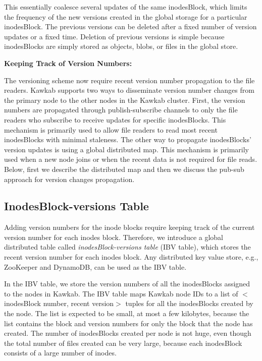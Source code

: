 \documentclass[]{article}
\newcommand{\subtopic}[1]{\vspace{1.5pt} \noindent \textbf{#1}}
\begin{document}
This essentially coalesce several updates of the same inodesBlock, which limits
the frequency of the new versions created in the global storage for a particular
inodesBlock. The previous versions can be deleted after a fixed number of
version updates or a fixed time. Deletion of previous versions is simple
because inodesBlocks are simply stored as objects, blobs, or files in the
global store.


\subtopic{Keeping Track of Version Numbers:}

The versioning scheme now require recent version number propagation to the file
readers. Kawkab supports two ways to disseminate version number changes from
the primary node to the other nodes in the Kawkab cluster. First, the version
numbers are propagated through publish-subscribe channels to only the file
readers who subscribe to receive updates for specific inodesBlocks.  This
mechanism is primarily used to allow file readers to read most recent
inodesBlocks with minimal staleness. The other way to propagate inodesBlocks'
version updates is using a global distributed map. This mechanism is primarily
used when a new node joins or when the recent data is not required for file
reads. Below, first we describe the distributed map and then we discuss the
pub-sub approach for version changes propagation.

\subsection{InodesBlock-versions Table}

Adding version numbers for the inode blocks require keeping track of the
current version number for each inodes block. Therefore, we introduce a global
distributed table called \textit{inodesBlock-versions table} (IBV table),
which  stores the recent version number for each inodes block. Any distributed
key value store, e.g., ZooKeeper and DynamoDB, can be used as the IBV table. 

In the IBV table, we store the version numbers of all the inodesBlocks
assigned to the nodes in Kawkab. The IBV table maps Kawkab node IDs to a list
of $<$inodesBlock number, recent version$>$ tuples for all the inodesBlocks
created by the node. The list is expected to be small, at most a few kilobytes, 
because the list
contains the block and version numbers for only the block that the node
has created.  The number of inodesBlocks created per node is not huge, 
even though the total number of files created can be very large,
because each inodesBlock consists of a large number of inodes. 
\end{document}
